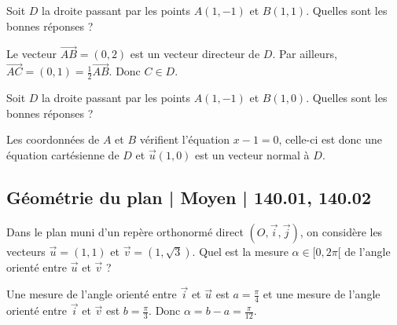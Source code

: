 \begin{question}

Soit $D$ la droite passant par les points $A(1,-1)$ et $B(1,1)$. Quelles sont les bonnes réponses ?
\begin{answers}  
\end{answers}
\begin{explanations}
Le vecteur $\overrightarrow{AB}=(0,2)$ est un vecteur directeur de $D$. Par ailleurs, $\overrightarrow{AC}=(0,1)=\frac{1}{2}\overrightarrow{AB}$. Donc $C\in D$.
\end{explanations}
\end{question}


\begin{question}

Soit $D$ la droite passant par les points $A(1,-1)$ et $B(1,0)$. Quelles sont les bonnes réponses ?
\begin{answers}  
\end{answers}
\begin{explanations}
Les coordonnées de $A$ et $B$ vérifient l'équation $x-1=0$, celle-ci est donc une équation cartésienne de $D$ et $\vec{u}(1,0)$ est un vecteur normal à $D$.
\end{explanations}
\end{question}


\subsection{Géométrie du plan | Moyen | 140.01, 140.02}


\begin{question}

Dans le plan muni d'un repère orthonormé direct $(O,\vec{i},\vec{j})$, on considère les vecteurs $\displaystyle \vec{u}=\left(1,1\right)$ et $\displaystyle \vec{v}=\left(1,\sqrt{3}\right)$. Quel est la mesure $\alpha \in [0,2\pi[$ de l'angle orienté entre $\vec{u}$ et $\vec{v}$ ?
\begin{answers}  
\end{answers}
\begin{explanations}
Une mesure de l'angle orienté entre $\vec{i}$ et $\vec{u}$ est $\displaystyle a=\frac{\pi}{4}$ et une mesure de l'angle orienté entre $\vec{i}$ et $\vec{v}$ est $\displaystyle b=\frac{\pi}{3}$. Donc $\displaystyle \alpha =b-a=\frac{\pi}{12}$.
\end{explanations}
\end{question}


